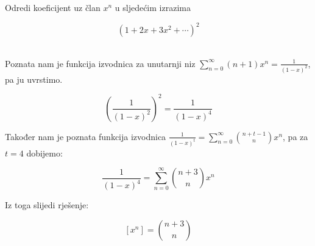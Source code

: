 \documentclass[exam.tex]{subfiles}
\begin{document}
	\begin{subtask}
		Odredi koeficijent uz član \( x^n \) u sljedećim izrazima
	
		\[ (1 + 2x + 3x^2 + \cdots)^2 \] \\
	\end{subtask}
	
	Poznata nam je funkcija izvodnica za unutarnji niz \( \sum\limits^\infty_{n=0} (n + 1) x^n = \frac{1}{(1 - x)^2} \), pa ju uvrstimo.
	
	\[ \left ( \frac{1}{(1 - x)^2} \right )^2 = \frac{1}{(1 - x)^4} \]
	
	Također nam je poznata funkcija izvodnica \( \frac{1}{(1 - x)^t} = \sum\limits^\infty_{n=0} \binom{n + t - 1}{n} x^n \), pa za \( t = 4 \) dobijemo: 
	
	\[ \frac{1}{(1 - x)^4} = \sum\limits^\infty_{n=0} \binom{n + 3}{n} x^n \]
	
	Iz toga slijedi rješenje:
	
	\[ [x^n] = \binom{n + 3}{n} \]
\end{document}
